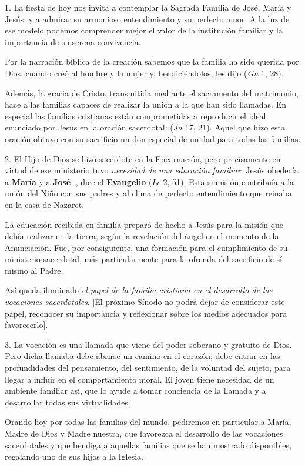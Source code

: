 				\begin{body}
					1. La fiesta de hoy nos invita a contemplar la Sagrada Familia de José, María y Jesús, y a admirar su armonioso entendimiento y su perfecto amor. A la luz de ese modelo podemos comprender mejor el valor de la institución familiar y la importancia de su serena convivencia.
					
					Por la narración bíblica de la creación sabemos que la familia ha sido querida por Dios, cuando creó al hombre y la mujer y, bendiciéndolos, les dijo  (\emph{Gn} 1, 28).
					
					Además, la gracia de Cristo, transmitida mediante el sacramento del matrimonio, hace a las familias capaces de realizar la unión a la que han sido llamadas. En especial las familias cristianas están comprometidas a reproducir el ideal enunciado por Jesús en la oración sacerdotal:  (\emph{Jn} 17, 21). Aquel que hizo esta oración obtuvo con su sacrificio un don especial de unidad para todas las familias.
					
					2. El Hijo de Dios se hizo sacerdote en la Encarnación, pero precisamente en virtud de ese ministerio tuvo \emph{necesidad de una educación familiar}. Jesús obedecía a \textbf{María} y a \textbf{José}: , dice el \textbf{Evangelio} (\emph{Lc} 2, 51). Esta sumisión contribuía a la unión del Niño con sus padres y al clima de perfecto entendimiento que reinaba en la casa de Nazaret.
					
					La educación recibida en familia preparó de hecho a Jesús para la misión que debía realizar en la tierra, según la revelación del ángel en el momento de la Anunciación. Fue, por consiguiente, una formación para el cumplimiento de su ministerio sacerdotal, más particularmente para la ofrenda del sacrificio de sí mismo al Padre.
					
					Así queda iluminado \emph{el papel de la familia cristiana en el desarrollo de las vocaciones sacerdotales}. {[}El próximo Sínodo no podrá dejar de considerar este papel, reconocer su importancia y reflexionar sobre los medios adecuados para favorecerlo{]}.
					
					3. La vocación es una llamada que viene del poder soberano y gratuito de Dios. Pero dicha llamaba debe abrirse un camino en el corazón; debe entrar en las profundidades del pensamiento, del sentimiento, de la voluntad del sujeto, para llegar a influir en el comportamiento moral. El joven tiene necesidad de un ambiente familiar así, que lo ayude a tomar conciencia de la llamada y a desarrollar todas sus virtualidades.
					
					Orando hoy por todas las familias del mundo, pediremos en particular a María, Madre de Dios y Madre nuestra, que favorezca el desarrollo de las vocaciones sacerdotales y que bendiga a aquellas familias que se han mostrado disponibles, regalando uno de sus hijos a la Iglesia.
				\end{body}

